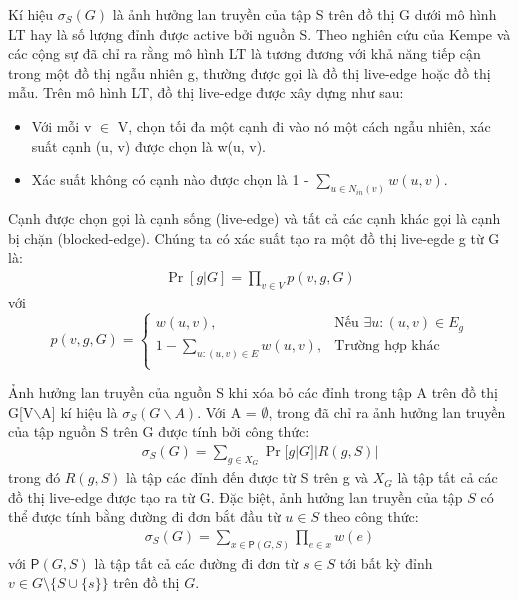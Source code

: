 Kí hiệu $\sigma_{S}(G)$ là ảnh hưởng lan truyền của tập S trên đồ thị G dưới mô hình LT hay là số lượng đỉnh được active bởi nguồn S. Theo nghiên cứu của Kempe và các cộng sự \cite{kemple1} đã chỉ ra rằng mô hình LT là tương đương với khả năng tiếp cận trong một đồ thị ngẫu nhiên g, thường được gọi là đồ thị live-edge hoặc đồ thị mẫu. Trên mô hình LT, đồ thị live-edge được xây dựng như sau:
\begin {itemize}
\item Với mỗi v $\in$ V, chọn tối đa một cạnh đi vào nó một cách ngẫu nhiên, xác suất cạnh (u, v) được chọn là w(u, v).

\item Xác suất không có cạnh nào được chọn là 1 - $\sum_{u \in N_{in}(v)} w(u,v)$.
\end {itemize}

Cạnh được chọn gọi là cạnh sống (live-edge) và tất cả các cạnh khác gọi là cạnh bị chặn (blocked-edge). Chúng ta có xác suất tạo ra một đồ thị live-egde g từ G là:
\begin{align}
\Pr[g|G]=\prod_{v \in V}{p(v,g,G)}
\end{align}
với
\begin{equation}
p(v, g, G)= \left\{ \begin{array}{ll}
w(u, v), & \mbox{Nếu $\exists u: (u, v) \in E_g$}\\
1-\sum_{u:(u, v) \in E}{w(u, v)}, & \mbox{Trường hợp khác}\\
\end{array} \right.
\end{equation}

Ảnh hưởng lan truyền của nguồn S khi xóa bỏ các đỉnh trong tập A trên đồ thị G[V$\backslash$A] kí hiệu là $\sigma_{S}(G \backslash A)$. Với A = $\emptyset$, trong \cite{kemple1} đã chỉ ra ảnh hưởng lan truyền của tập nguồn S trên G được tính bởi công thức:
\begin{align}
\sigma_S(G)=\sum_{g \in X_G}{\Pr[g|G]|R(g, S)|}
\label{inf_cal}
\end{align}
trong đó $R(g, S)$ là tập các đỉnh đến được từ S trên g và $X_G$ là tập tất cả các đồ thị live-edge được tạo ra từ G. Đặc biệt, ảnh hưởng lan truyền của tập $S$ có thể được tính bằng đường đi đơn bắt đầu từ $u \in S$ theo công thức: 
\begin{align}
\sigma_{S}(G)=\sum_{x \in \mathsf{P}(G, S)} \prod_{e \in x}w(e)
\label{inf_path}
\end{align} 				
với $\mathsf{P}(G, S)$ là tập tất cả các đường đi đơn từ $s \in S$ tới bất kỳ đỉnh $v \in G \setminus \{S \cup \{s\} \} $ trên đồ thị $G$.		

